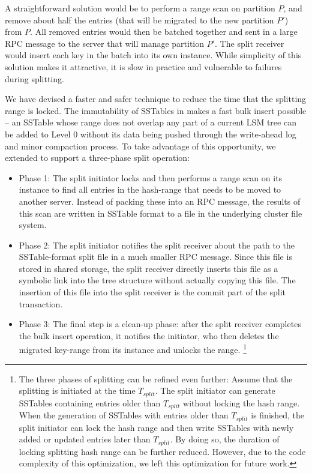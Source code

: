 A straightforward solution would be to perform a range scan on
partition $P$, and remove about half the entries
(that will be migrated to the new partition $P'$) from $P$.
All removed entries would then be batched together
and sent in a large RPC message to the server that will manage partition $P'$.
The split receiver would insert each key in the batch into its own \tfs instance.
While simplicity of this solution makes it attractive,
it is slow in practice and vulnerable to failures during splitting.

We have devised a faster and safer technique to
reduce the time that the splitting range is locked.
The immutability of SSTables in \ldb makes a fast bulk insert possible --
an SSTable whose range does not overlap any part of a current LSM tree
can be added to Level 0 without its data being pushed through the
write-ahead log and minor compaction process.
To take advantage of this opportunity, we extended \tfs
to support a three-phase \giga split operation:

\begin{itemize}
\item{Phase 1:} The split initiator locks and
then performs a range scan on its \tfs instance
to find all entries in the hash-range that needs to be moved to another server.
Instead of packing these into an RPC message,
the results of this scan are written in SSTable format to a file in the
underlying cluster file system.

\item{Phase 2:} The split initiator notifies the split receiver about
the path to the SSTable-format split file in a much smaller RPC message.
Since this file is stored in shared storage,
the split receiver directly inserts this file as a symbolic link
into the \ldb tree structure without actually copying this file.
The insertion of this file into the split receiver is the commit
part of the split transaction.

\item{Phase 3:} The final step is a clean-up phase:
after the split receiver completes the bulk insert operation, it notifies the
initiator, who then deletes the migrated key-range from its \tfs instance
and unlocks the range.
\footnote{The three phases of splitting can be refined even further:
Assume that the splitting is initiated at the time $T_{split}$.
The split initiator can generate SSTables containing entries
older than $T_{split}$ without locking the hash range.
When the generation of SSTables with entries older than $T_{split}$ is finished,
the split initiator can lock the hash range and then write SSTables with
newly added or updated entries later than $T_{split}$.
By doing so, the duration of locking splitting hash range can be further reduced.
However, due to the code complexity of this optimization,
we left this optimization for future work.}

\end{itemize}


